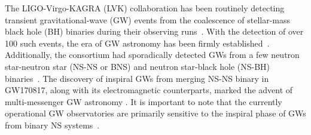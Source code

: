 \documentclass[aps,prd,twocolumn,superscriptaddress,groupedaddress,nofootinbib,showpacs,eqsecnum,useAms]{revtex4-2}
\begin{document}

The LIGO-Virgo-KAGRA (LVK) collaboration has been routinely detecting transient gravitational-wave (GW) events from the coalescence of stellar-mass black hole (BH) binaries during their observing runs~\cite{Abbott_2020, AasiJ2015, Acernese_2014, ptaa125, PhysRevD.88.043007, GraceDBO4}. With the detection of over 100 such events, the era of GW astronomy has been firmly established~\cite{LIGOScientific:2018mvr, Abbott:2020niy, LIGOScientific:2021usb, LVK_O3c}. Additionally, the consortium had sporadically detected GWs from a few neutron star-neutron star (NS-NS or BNS) and neutron star-black hole (NS-BH) binaries~\cite{LVK_GW170817, BHNSs}. The discovery of inspiral GWs from merging NS-NS binary in GW170817, along with its electromagnetic counterparts, marked the advent of multi-messenger GW astronomy \cite{MM170817}. It is important to note that the currently operational GW observatories are primarily sensitive to the inspiral phase of GWs from binary NS systems~\cite{LVK_GW170817}.
\end{document}
